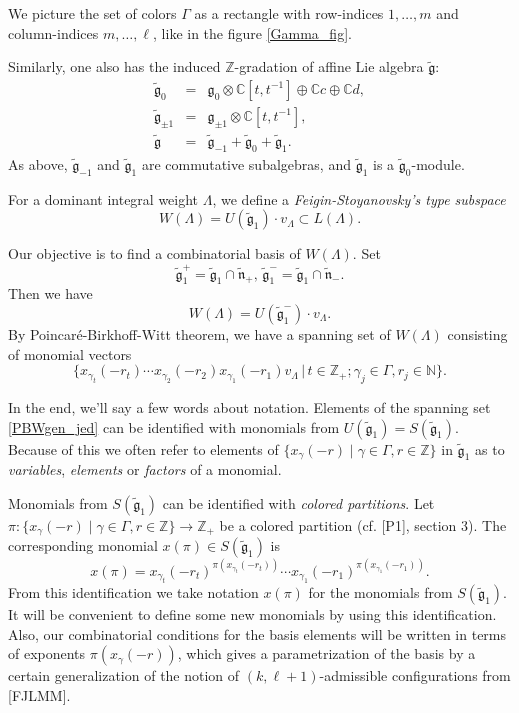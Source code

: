 \documentclass[a4paper, 10pt,oneside]{amsart}
\begin{document}
We picture the
set of colors $\Gamma$ as a rectangle with
row-indices $1,\dots,m$ and column-indices $m,\dots,\ell$, like in the figure \ref{Gamma_fig}.

Similarly, one also has the induced ${{\mathbb Z}}$-gradation of  affine Lie
algebra ${\tilde{{\mathfrak g}}}$:
\begin{eqnarray*}
{\tilde{{\mathfrak g}}}_0 & = & {\mathfrak g}_0\otimes{{\mathbb C}} [t,t^{-1}]\oplus {{\mathbb C}} c \oplus {{\mathbb C}} d,\\
{\tilde{{\mathfrak g}}}_{\pm 1} & = & {\mathfrak g}_{\pm 1}\otimes{{\mathbb C}} [t,t^{-1}],\\
{\tilde{{\mathfrak g}}} & = & {\tilde{{\mathfrak g}}}_{-1} + {\tilde{{\mathfrak g}}}_0 + {\tilde{{\mathfrak g}}}_1.
\end{eqnarray*}
As above, ${\tilde{{\mathfrak g}}}_{-1}$ and ${\tilde{{\mathfrak g}}}_1$ are commutative subalgebras, and
${\tilde{{\mathfrak g}}}_1$ is a ${\tilde{{\mathfrak g}}}_0$-module.

For a dominant integral weight $\Lambda$, we define a
\emph{Feigin-Stoyanovsky's type subspace}
$$W(\Lambda)=U({\tilde{{\mathfrak g}}}_1)\cdot v_\Lambda\subset L(\Lambda).$$

Our objective is to find a combinatorial basis of  $W(\Lambda)$. Set
$${\tilde{{\mathfrak g}}}_1^+={\tilde{{\mathfrak g}}}_1\cap {\tilde{{\mathfrak n}}}_+,\, {\tilde{{\mathfrak g}}}_1^-={\tilde{{\mathfrak g}}}_1\cap {\tilde{{\mathfrak n}}}_-.$$ Then we have
$$W(\Lambda)=U({\tilde{{\mathfrak g}}}_1^-)\cdot v_\Lambda.$$
By Poincar\'e-Birkhoff-Witt theorem, we have a spanning set of
$W(\Lambda)$ consisting of monomial vectors
\begin{equation}\label{PBWgen_jed}\{x_{\gamma_t}(-r_t)\cdots
x_{\gamma_2}(-r_2) x_{\gamma_1}(-r_1) v_\Lambda\,|\, t\in{{\mathbb Z}}_+;
\gamma_j\in \Gamma, r_j\in{{\mathbb N}}\}.\end{equation}

In the end, we'll say a few words about notation.  Elements of the
spanning set \eqref{PBWgen_jed} can be identified with monomials from
$U({\tilde{{\mathfrak g}}}_1)=S({\tilde{{\mathfrak g}}}_1)$. Because of this we often refer to
elements of $\{x_\gamma(-r) \mid \gamma\in\Gamma,r\in {{\mathbb Z}}\}$ in
${\tilde{{\mathfrak g}}}_1$ as to {\em variables}, {\em elements} or {\em factors}
of a monomial.

Monomials from $S({\tilde{{\mathfrak g}}}_1)$ can be identified with {\em colored
partitions}. Let
$\pi:\{x_\gamma(-r) \mid \gamma\in\Gamma,r\in {{\mathbb Z}}\}\to {{\mathbb Z}}_+$ be a
colored partition (cf. [P1], section 3). The corresponding monomial
$x(\pi)\in S({\tilde{{\mathfrak g}}}_1)$ is
$$x(\pi)=x_{\gamma_t}(-r_t)^{\pi(x_{\gamma_t}(-r_t))}\cdots x_{\gamma_1}(-r_1)^{\pi(x_{\gamma_1}(-r_1))}.$$
From this identification we take notation $x(\pi)$ for the
monomials from $S({\tilde{{\mathfrak g}}}_1)$. It will be convenient to define some new monomials
by using this identification. Also, our combinatorial conditions for the basis elements will be written in terms of exponents $\pi(x_\gamma(-r))$,
which gives a parametrization of the basis by a certain generalization of the notion of $(k,\ell +1)$-admissible configurations from [FJLMM].
\end{document}
